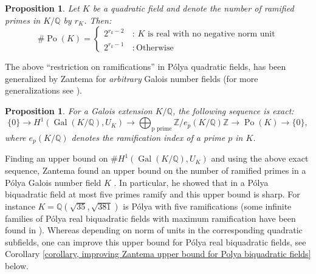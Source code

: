 \documentclass{jams-l}
\newtheorem{proposition}[theorem]{Proposition}
\theoremstyle{definition}
\theoremstyle{remark}
\newtheorem{remark}[theorem]{Remark}
\numberwithin{equation}{section}
\DeclareMathOperator{\Po}{Po}
\DeclareMathOperator{\Gal}{Gal}
\begin{document}
\begin{proposition} \cite[Theorem 105-106]{Hilbert's book} \label{proposition, Hilbert's theorem}
Let $K$ be a quadratic field and denote the number of ramified primes in $K/\mathbb{Q}$ by $r_{K}$. Then:
\begin{equation*}
\# \Po(K) =
\begin{cases}
2^{r_k-2} \,  &: \,   \text{$K$ is real with no negative norm unit} \\
2^{r_k-1} \,  &: \,   \text{Otherwise}
\end{cases}
\end{equation*}

\end{proposition}

The above ``restriction on ramifications'' in P\'olya quadratic fields, has  been generalized by Zantema  for \textit{arbitrary} Galois number fields (for more generalizations see \cite{MR2,ChabertI}).


\begin{proposition}\cite[Proposition 3.1]{Zantema} \label{proposition, Zantema's exact sequence2}
For a Galois extension $K/\mathbb{Q}$, the following sequence is exact:
\begin{equation} \label{equation, Zantema exact sequence}
\{0\} \longrightarrow H^1(\Gal(K/\mathbb{Q}),U_K) \longrightarrow \bigoplus _{\text{p prime}} \mathbb{Z} / e_p(K/\mathbb{Q}) \mathbb{Z} \longrightarrow \Po(K) \longrightarrow \{0\},
\end{equation}
where $e_p(K/\mathbb{Q})$ denotes the ramification index of a prime $p$ in $K$.
\end{proposition}


Finding an upper bound on $\#H^1(\Gal(K/\mathbb{Q}),U_K)$ and using the above exact sequence, Zantema found an upper bound on the number of ramified primes in a P\'olya Galois number field $K$ \cite[$\S$ 5]{Zantema}. In particular, he showed that in a P\'olya biquadratic field at most five primes ramify and this upper bound is sharp. For instance $K=\mathbb{Q}(\sqrt{35}, \sqrt{381})$ is P\'olya with five ramifications \cite[page 20]{Zantema} (some infinite families of P\'olya real biquadratic fields with maximum ramification have been found in \cite{MaarefJNT2021}). Whereas depending on norm of units in the corresponding quadratic subfields, one can improve this  upper bound for P\'olya real biquadratic fields, see Corollary \eqref{corollary, improving Zantema upper bound for Polya biquadratic fields} below.
\end{document}
